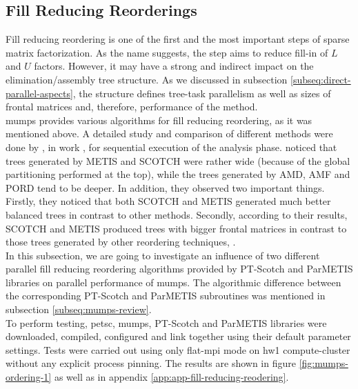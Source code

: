 \subsection{Fill Reducing Reorderings}
\label{subseq:fill-in-reordering}

Fill reducing reordering is one of the first and the most important steps of sparse matrix factorization. As the name suggests, the step aims to reduce fill-in of $L$ and $U$ factors. However, it may have a strong and indirect impact on the elimination/assembly tree structure. As we discussed in subsection \ref{subseq:direct-parallel-aspects}, the structure defines tree-task parallelism as well as sizes of frontal matrices and, therefore, performance of the method.\\


\acrshort{mumps} provides various algorithms for fill reducing reordering, as it was mentioned above. A detailed study and comparison of different methods were done by \citeauthor{guermouche2003memory}, in work \cite{guermouche2003memory}, for sequential execution of the analysis phase. \citeauthor{guermouche2003memory} noticed that  trees generated by METIS and SCOTCH were rather wide (because of the global partitioning performed at the top), while the trees generated by AMD, AMF and PORD tend to be deeper. In addition, they observed two important things. Firstly, they noticed that both SCOTCH and METIS generated much better balanced trees in contrast to other methods. Secondly, according to their results, SCOTCH and METIS produced trees with bigger frontal matrices in contrast to those trees generated by other reordering techniques, \cite{guermouche2003memory}.\\


In this subsection, we are going to investigate an influence of two different parallel fill reducing reordering algorithms provided by PT-Scotch and ParMETIS libraries on parallel performance of \acrshort{mumps}. The algorithmic difference between the corresponding PT-Scotch and ParMETIS subroutines was mentioned in subsection \ref{subseq:mumps-review}.\\


To perform testing, \acrshort{petsc}, \acrshort{mumps}, PT-Scotch and ParMETIS libraries were downloaded, compiled, configured and link together using their default parameter settings. Tests were carried out using only flat-\acrshort{mpi} mode on \gls{hw1} compute-cluster without any explicit process pinning. The results are shown in figure \ref{fig:mumps-ordering-1} as well as in appendix \ref{app:app-fill-reducing-reodering}.\\


